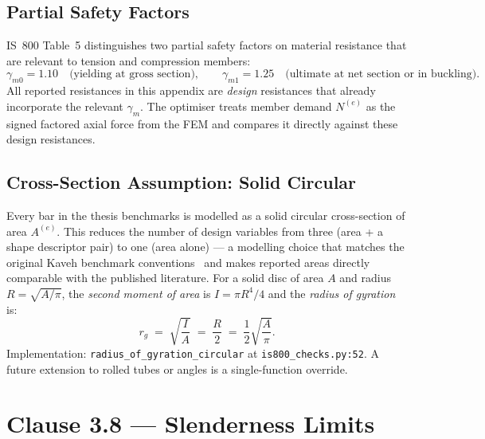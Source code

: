 \subsection{Partial Safety Factors}
\label{app:is800:gamma}

IS~800 Table~5 distinguishes two partial safety factors on
material resistance that are relevant to tension and compression
members:
\begin{equation}
  \gamma_{m0} = \num{1.10}
  \quad\text{(yielding at gross section)},
  \qquad
  \gamma_{m1} = \num{1.25}
  \quad\text{(ultimate at net section or in buckling)}.
\end{equation}
All reported resistances in this appendix are \emph{design}
resistances that already incorporate the relevant $\gamma_m$.
The optimiser treats member demand $N^{(e)}$ as the signed
factored axial force from the FEM and compares it directly against
these design resistances.

\subsection{Cross-Section Assumption: Solid Circular}
\label{app:is800:section}

Every bar in the thesis benchmarks is modelled as a solid circular
cross-section of area $A^{(e)}$. This reduces the number of
design variables from three (area + a shape descriptor pair) to
one (area alone) --- a modelling choice that matches the original
Kaveh benchmark conventions~\cite{kaveh2010} and makes reported
areas directly comparable with the published literature. For a
solid disc of area $A$ and radius $R=\sqrt{A/\pi}$,
the \emph{second moment of area} is $I=\pi R^4/4$ and the
\emph{radius of gyration} is:
\begin{equation}
  r_g \;=\; \sqrt{\frac{I}{A}} \;=\; \frac{R}{2}
  \;=\; \frac{1}{2}\sqrt{\frac{A}{\pi}}.
  \label{eq:is800:rg}
\end{equation}
Implementation: \texttt{radius\_of\_gyration\_circular} at
\texttt{is800\_checks.py:52}. A future extension to rolled tubes
or angles is a single-function override.

\section{Clause 3.8 --- Slenderness Limits}
\label{app:is800:clause3_8}

